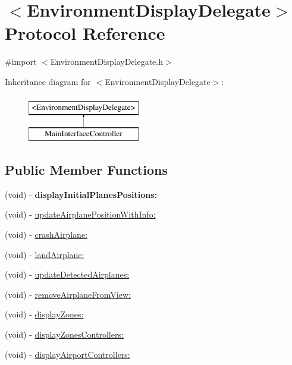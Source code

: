\hypertarget{protocol_environment_display_delegate-p}{
\section{$<$\-Environment\-Display\-Delegate$>$ \-Protocol \-Reference}
\label{protocol_environment_display_delegate-p}
}


{\ttfamily \#import $<$\-Environment\-Display\-Delegate.\-h$>$}

\-Inheritance diagram for $<$\-Environment\-Display\-Delegate$>$\-:\begin{figure}[H]
\begin{center}
\leavevmode
\includegraphics[height=2.000000cm]{protocol_environment_display_delegate-p}
\end{center}
\end{figure}
\subsection*{\-Public \-Member \-Functions}
\begin{DoxyCompactItemize}
\item 
\hypertarget{protocol_environment_display_delegate-p_a327e6b4140949f5be71c424110a5a33b}{
(void) -\/ {\bfseries display\-Initial\-Planes\-Positions\-:}}
\label{protocol_environment_display_delegate-p_a327e6b4140949f5be71c424110a5a33b}

\item 
(void) -\/ \hyperlink{protocol_environment_display_delegate-p_a1559bebd382b8e2f92cd208ed2df7257}{update\-Airplane\-Position\-With\-Info\-:}
\item 
(void) -\/ \hyperlink{protocol_environment_display_delegate-p_abbd874ce2805ceb3adef3c4adff829e2}{crash\-Airplane\-:}
\item 
(void) -\/ \hyperlink{protocol_environment_display_delegate-p_a9e3181804078c0c560e9b687575c1573}{land\-Airplane\-:}
\item 
(void) -\/ \hyperlink{protocol_environment_display_delegate-p_aee15f5cb6ec0982ef420038d8204346d}{update\-Detected\-Airplanes\-:}
\item 
(void) -\/ \hyperlink{protocol_environment_display_delegate-p_a643b1c2a84a7922054b5f60261798939}{remove\-Airplane\-From\-View\-:}
\item 
(void) -\/ \hyperlink{protocol_environment_display_delegate-p_a935e669095c4a629e13bf988e8fbec8a}{display\-Zones\-:}
\item 
(void) -\/ \hyperlink{protocol_environment_display_delegate-p_a08acc906c82c57c0b90c5657252bc094}{display\-Zones\-Controllers\-:}
\item 
(void) -\/ \hyperlink{protocol_environment_display_delegate-p_a1a33acac7b147781d25964a642dba4e8}{display\-Airport\-Controllers\-:}
\end{DoxyCompactItemize}


